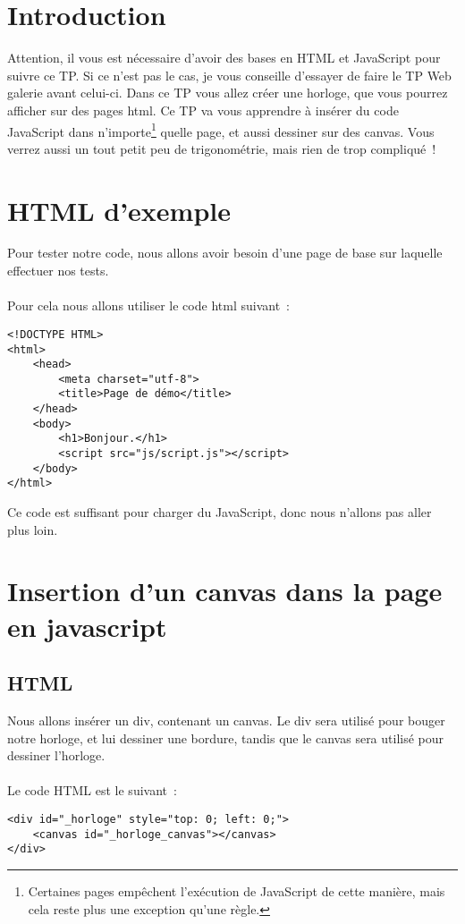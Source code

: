 \section{Introduction}
Attention, il vous est nécessaire d’avoir des bases en HTML et JavaScript pour
suivre ce TP. Si ce n’est pas le cas, je vous conseille d’essayer de faire le TP
Web galerie avant celui-ci.
Dans ce TP vous allez créer une horloge, que vous pourrez afficher sur des pages
html.
Ce TP va vous apprendre à insérer du code JavaScript dans
n’importe\footnote{Certaines pages empêchent l’exécution de JavaScript de cette
manière, mais cela reste plus une exception qu’une règle.} quelle page, et aussi
dessiner sur des canvas. Vous verrez aussi un tout petit peu de trigonométrie,
mais rien de trop compliqué !

\section{HTML d’exemple}
Pour tester notre code, nous allons avoir besoin d’une page de base sur laquelle
effectuer nos tests.
\paragraph{}
Pour cela nous allons utiliser le code html suivant :

\begin{verbatim}
<!DOCTYPE HTML>
<html>
    <head>
        <meta charset="utf-8">
        <title>Page de démo</title>
    </head>
    <body>
        <h1>Bonjour.</h1>
        <script src="js/script.js"></script>
    </body>
</html>
\end{verbatim}

Ce code est suffisant pour charger du JavaScript, donc nous n’allons pas aller plus loin.

\section{Insertion d’un canvas dans la page en javascript}
\subsection{HTML}
Nous allons insérer un div, contenant un canvas. Le div sera utilisé pour bouger
notre horloge, et lui dessiner une bordure, tandis que le canvas sera utilisé
pour dessiner l’horloge.
\paragraph{}
Le code HTML est le suivant :
\begin{verbatim}
<div id="_horloge" style="top: 0; left: 0;">
    <canvas id="_horloge_canvas"></canvas>
</div>
\end{verbatim}

